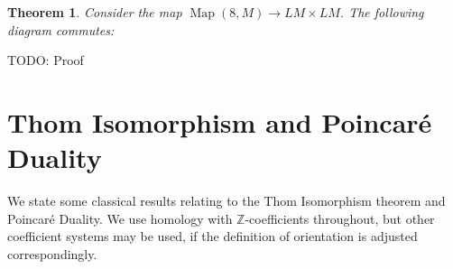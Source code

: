 \documentclass{scrartcl}
\theoremstyle{plain}
\newtheorem{theorem}{Theorem}[section]
\theoremstyle{definition}
\newcommand{\Z}{\mathbb Z}
\DeclareMathOperator{\Map}{Map}
\begin{document}
\begin{theorem}
    Consider the map $\Map(8, M)\to LM\times LM$. The following diagram commutes:

    \begin{center}
    \end{center}
\end{theorem}

TODO: Proof









\newpage
\appendix
\section{Thom Isomorphism and Poincaré Duality}
We state some classical results relating to the Thom Isomorphism theorem and Poincaré Duality. We use homology with $\Z$-coefficients throughout, but other coefficient systems may be used, if the definition of orientation is adjusted correspondingly.
\end{document}
